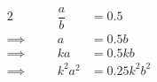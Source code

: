 \documentclass[12pt]{article}
\begin{document}
\begin{alignat*}{2}
&&\dfrac{a}{b} &= 0.5\\
\implies&&a &= 0.5b\\
\implies&&ka &=0.5kb\\
\implies&\quad&k^2a^2 &= 0.25k^2 b^2
\end{alignat*}
\end{document}
